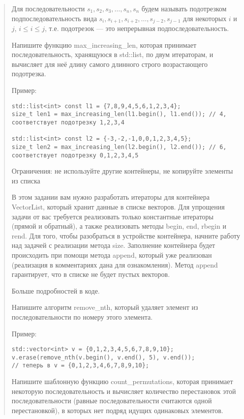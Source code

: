 \documentclass[]{article}
\begin{document}
\begin{quote}
Для последовательности $s_{1},s_{2},s_{3},\dots,s_{n},s_n $ будем называть подотрезком подпоследовательность вида 
$s_i,s_{i+1},s_{i+2},\dots,s_{j-2},s_{j-1}$ для некоторых $i$ и $j$, $i\le i\le j $, 
т.е. подотрезок — это непрерывная подпоследовательность.

Напишите функцию max\_increasing\_len, которая принимает последовательность, хранящуюся в std::list, по двум итераторам, и вычисляет для неё длину самого длинного строго возрастающего подотрезка.

Пример:
\begin{verbatim}
std::list<int> const l1 = {7,8,9,4,5,6,1,2,3,4};
size_t len1 = max_increasing_len(l1.begin(), l1.end()); // 4, соответствует подотрезку 1,2,3,4

std::list<int> const l2 = {-3,-2,-1,0,0,1,2,3,4,5};
size_t len2 = max_increasing_len(l2.begin(), l2.end()); // 6, соответствует подотрезку 0,1,2,3,4,5

\end{verbatim}
Ограничения: не используйте другие контейнеры, не копируйте элементы из списка



В этом задании вам нужно разработать итераторы для контейнера VectorList, который хранит данные в списке векторов. Для упрощения задачи от вас требуется реализовать только константные итераторы (прямой и обратный), а также реализовать методы begin, end, rbegin и rend. Для того, чтобы разобраться в устройстве контейнера, начните работу над задачей с реализации метода size. Заполнение контейнера будет происходить при помощи метода append, который уже реализован (реализация в комментариях дана для ознакомления). Метод append гарантирует, что в списке не будет пустых векторов.

Больше подробностей в коде.



Напишите алгоритм remove\_nth, который удаляет элемент из последовательности по номеру этого элемента.

Пример:
\begin{verbatim}
std::vector<int> v = {0,1,2,3,4,5,6,7,8,9,10};
v.erase(remove_nth(v.begin(), v.end(), 5), v.end());
// теперь в v = {0,1,2,3,4,6,7,8,9,10};

\end{verbatim}

Напишите шаблонную функцию count\_permutations, которая принимает некоторую последовательность и вычисляет количество перестановок этой последовательности (равные последовательности считаются одной перестановкой), в которых нет подряд идущих одинаковых элементов.


\end{quote}
\end{document}
